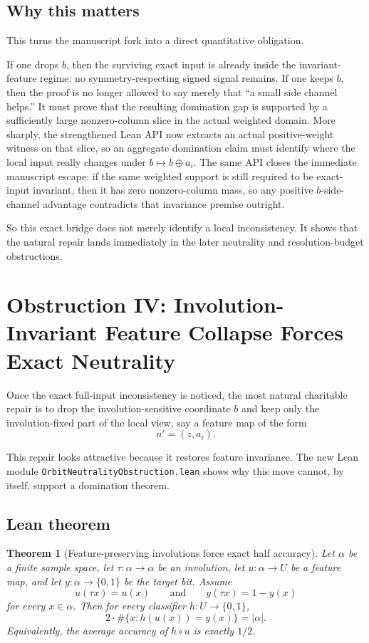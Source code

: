 \documentclass[11pt]{article}
\newtheorem{theorem}{Theorem}[section]
\theoremstyle{remark}
\begin{document}
\subsection{Why this matters}

This turns the manuscript fork into a direct quantitative obligation.

If one drops \(b\), then the surviving exact input is already inside the invariant-feature regime:
no symmetry-respecting signed signal remains.  If one keeps \(b\), then the proof is no longer
allowed to say merely that ``a small side channel helps.''  It must prove that the resulting
domination gap is supported by a sufficiently large nonzero-column slice in the actual weighted
domain.  More sharply, the strengthened Lean API now extracts an actual positive-weight witness
on that slice, so an aggregate domination claim must identify where the local input really changes
under \(b\mapsto b\oplus a_i\).  The same API closes the immediate manuscript escape: if the same weighted
support is still required to be exact-input invariant, then it has zero nonzero-column mass, so any
positive \(b\)-side-channel advantage contradicts that invariance premise outright.

So this exact bridge does not merely identify a local inconsistency.  It shows that the natural
repair lands immediately in the later neutrality and resolution-budget obstructions.

\section{Obstruction IV: Involution-Invariant Feature Collapse Forces Exact Neutrality}

Once the exact full-input inconsistency is noticed, the most natural charitable repair is to drop
the involution-sensitive coordinate \(b\) and keep only the involution-fixed part of the local view,
say a feature map of the form
\[
  u' = (z, a_i).
\]

This repair looks attractive because it restores feature invariance.  The new Lean module
\texttt{OrbitNeutralityObstruction.lean} shows why this move cannot, by itself, support a
domination theorem.

\subsection{Lean theorem}

\begin{theorem}[Feature-preserving involutions force exact half accuracy]
Let \(\alpha\) be a finite sample space, let \(\tau : \alpha \to \alpha\) be an involution, let
\(u : \alpha \to U\) be a feature map, and let \(y : \alpha \to \{0,1\}\) be the target bit.
Assume
\[
  u(\tau x) = u(x)
  \qquad\text{and}\qquad
  y(\tau x) = 1 - y(x)
\]
for every \(x \in \alpha\).  Then for every classifier \(h : U \to \{0,1\}\),
\[
  2 \cdot \#\{x : h(u(x)) = y(x)\} = |\alpha|.
\]
Equivalently, the average accuracy of \(h \circ u\) is exactly \(1/2\).
\end{theorem}
\end{document}
